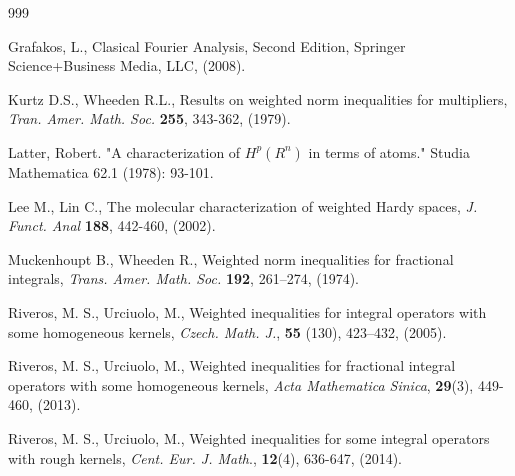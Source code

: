 \documentclass[a4paper,12pt,reqno]{amsart}
\numberwithin{equation}{section}
\begin{document}
\begin{thebibliography}{999}
		
		 Grafakos, L., Clasical Fourier Analysis, Second Edition, Springer Science+Business Media, LLC,  (2008).
		
		
		
		
		 Kurtz D.S., Wheeden R.L., Results on weighted norm inequalities for multipliers, \emph{Tran. Amer. Math. Soc.} \textbf{255}, 343-362, (1979).
		
		 Latter, Robert. "A characterization of $ H^{p}(R^{n}) $ in terms of atoms." Studia Mathematica 62.1 (1978): 93-101.
		
		 Lee M., Lin C.,  The molecular characterization of weighted Hardy spaces,  \emph{J. Funct. Anal}  \textbf{188}, 442-460, (2002).
		
		 Muckenhoupt B., Wheeden R., Weighted norm inequalities for fractional integrals, \emph{Trans. Amer. Math. Soc.} \textbf{192}, 261--274, (1974).
		
		
		
		
		
		 Riveros, M. S.,  Urciuolo, M., Weighted inequalities for
		integral operators with some homogeneous kernels, \emph{Czech. Math. J.}, \textbf{55} (130),  423--432, (2005).
		
		 Riveros, M. S.,  Urciuolo, M., Weighted inequalities for fractional integral operators with some homogeneous kernels,   \emph{Acta Mathematica Sinica}, \textbf{29}(3), 449-460, (2013).
		
		 Riveros, M. S.,  Urciuolo, M., Weighted inequalities for some integral operators with rough kernels, \emph{Cent. Eur. J. Math}.,\textbf{  12}(4), 636-647, (2014).
		

\end{thebibliography}
\end{document}
